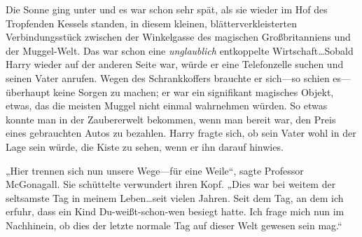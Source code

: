 Die Sonne ging unter und es war schon sehr spät, als sie wieder im Hof des Tropfenden Kessels standen, in diesem kleinen, blätterverkleisterten Verbindungsstück zwischen der Winkelgasse des magischen Großbritanniens und der Muggel-Welt. Das war schon eine \emph{unglaublich} entkoppelte Wirtschaft…Sobald Harry wieder auf der anderen Seite war, würde er eine Telefonzelle suchen und seinen Vater anrufen. Wegen des Schrankkoffers brauchte er sich—so schien es—überhaupt keine Sorgen zu machen; er war ein signifikant magisches Objekt, etwas, das die meisten Muggel nicht einmal wahrnehmen würden. So etwas konnte man in der Zaubererwelt bekommen, wenn man bereit war, den Preis eines gebrauchten Autos zu bezahlen. Harry fragte sich, ob sein Vater wohl in der Lage sein würde, die Kiste zu sehen, wenn er ihn darauf hinwies.

„Hier trennen sich nun unsere Wege—für eine Weile“, sagte Professor McGonagall. Sie schüttelte verwundert ihren Kopf. „Dies war bei weitem der seltsamste Tag in meinem Leben…seit vielen Jahren. Seit dem Tag, an dem ich erfuhr, dass ein Kind Du-weißt-schon-wen besiegt hatte. Ich frage mich nun im Nachhinein, ob dies der letzte normale Tag auf dieser Welt gewesen sein mag.“

